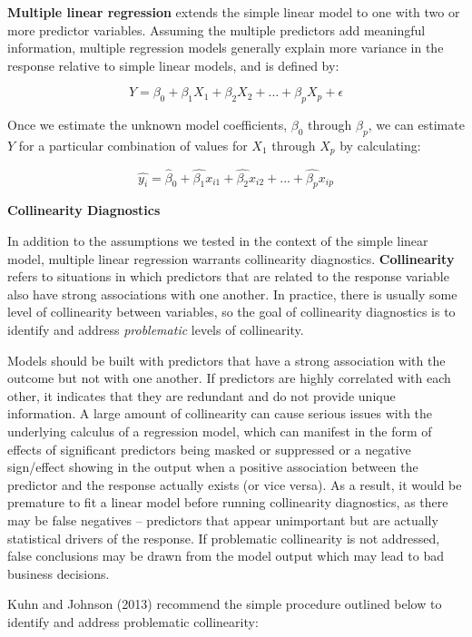 \documentclass[
]{book}
\begin{document}
\textbf{Multiple linear regression} extends the simple linear model to one with two or more predictor variables. Assuming the multiple predictors add meaningful information, multiple regression models generally explain more variance in the response relative to simple linear models, and is defined by:

\[ Y = \beta_0 + \beta_1 X_1 + \beta_2 X_2 + {...} + \beta_p X_p + \epsilon \]

Once we estimate the unknown model coefficients, \(\beta_0\) through \(\beta_p\), we can estimate \(Y\) for a particular combination of values for \(X_1\) through \(X_p\) by calculating:

\[ \hat{y_i} = \hat{\beta}_0 + \hat{\beta_1}x_{i1} + \hat{\beta_2}x_{i2} + {...} + \hat{\beta_p} x_{ip} \]

\textbf{Collinearity Diagnostics}

In addition to the assumptions we tested in the context of the simple linear model, multiple linear regression warrants collinearity diagnostics. \textbf{Collinearity} refers to situations in which predictors that are related to the response variable also have strong associations with one another. In practice, there is usually some level of collinearity between variables, so the goal of collinearity diagnostics is to identify and address \emph{problematic} levels of collinearity.

Models should be built with predictors that have a strong association with the outcome but not with one another. If predictors are highly correlated with each other, it indicates that they are redundant and do not provide unique information. A large amount of collinearity can cause serious issues with the underlying calculus of a regression model, which can manifest in the form of effects of significant predictors being masked or suppressed or a negative sign/effect showing in the output when a positive association between the predictor and the response actually exists (or vice versa). As a result, it would be premature to fit a linear model before running collinearity diagnostics, as there may be false negatives -- predictors that appear unimportant but are actually statistical drivers of the response. If problematic collinearity is not addressed, false conclusions may be drawn from the model output which may lead to bad business decisions.

Kuhn and Johnson (2013) recommend the simple procedure outlined below to identify and address problematic collinearity:
\end{document}
